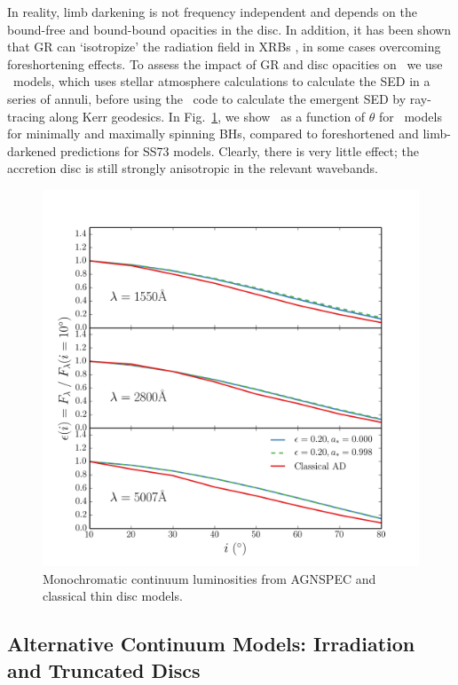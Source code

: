 \noindent
In reality, limb darkening is not frequency independent and 
depends on the bound-free and bound-bound opacities in the disc.
In addition, it has been shown that GR can `isotropize' the radiation
field in XRBs \citep{zhang1997,munozdarias2013}, in some cases overcoming
foreshortening effects. To assess the impact of GR and disc opacities
on \ept\ we use \agn\ models, which uses stellar atmosphere calculations to calculate the 
SED in a series of annuli, before using the \kerrtrans\ code 
to calculate the emergent SED by ray-tracing along Kerr geodesics.
In Fig.~\ref{fig:agnspec_disc}, we show \ept\ as a function of 
$\theta$ for \agn\ models for minimally and maximally spinning BHs,
compared to foreshortened and limb-darkened predictions for SS73 models.
Clearly, there is very little effect; 
the accretion disc is still strongly anisotropic in the relevant wavebands.

\begin{figure}
\centering
\includegraphics[width=1.0\textwidth]{figures/ewpaper/agnspec.png}
\caption
{
Monochromatic continuum luminosities from AGNSPEC and classical thin disc
models.
}
\label{fig:agnspec_disc}
\end{figure} 

\subsection{Alternative Continuum Models: Irradiation and Truncated Discs}

